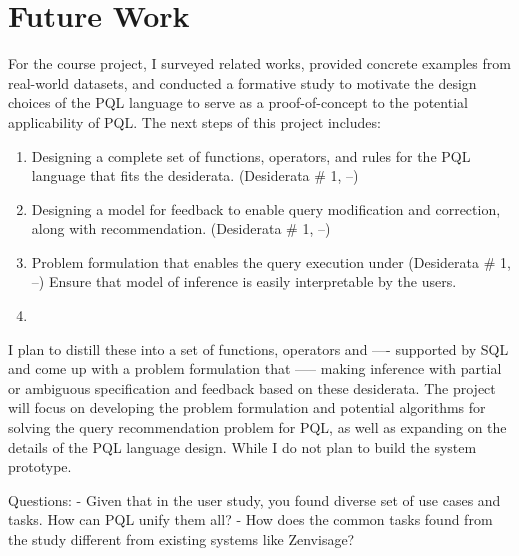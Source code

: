 \documentclass{sig-alternate-05-2015}
\begin{document}
\section{Future Work}
For the course project, I surveyed related works, provided concrete examples from real-world datasets, and conducted a formative study to motivate the design choices of the PQL language to serve as a proof-of-concept to the potential applicability of PQL. The next steps of this project includes: 
\begin{enumerate}
\item Designing a complete set of functions, operators, and rules for the PQL language that fits the desiderata. (Desiderata \# 1, --)
\item Designing a model for feedback to enable query modification and correction, along with recommendation. (Desiderata \# 1, --)
\item Problem formulation that enables the query execution under (Desiderata \# 1, --)
Ensure that model of inference is easily interpretable by the users.
\item 
\end{enumerate}
I plan to distill these into a set of functions, operators and ---- supported by SQL and come up with a problem formulation that ----- making inference with partial or ambiguous specification and feedback based on these desiderata.
The project will focus on developing the problem formulation and potential algorithms for solving the query recommendation problem for PQL, as well as expanding on the details of the PQL language design. While I do not plan to build the system prototype.

Questions: 
- Given that in the user study, you found diverse set of use cases and tasks. How can PQL unify them all? 
- How does the common tasks found from the study different from existing systems like Zenvisage?

  
\end{document}
